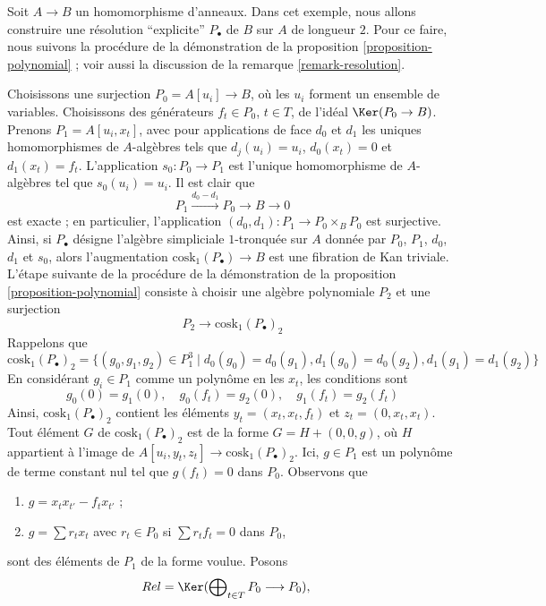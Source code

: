 \begin{example}
\label{example-resolution-length-two}
Soit $A \to B$ un homomorphisme d'anneaux. Dans cet exemple, nous allons 
construire une résolution ``explicite'' $P_\bullet$ de $B$ sur $A$ de longueur
$2$. Pour ce faire, nous suivons la procédure de la démonstration de la
proposition \ref{proposition-polynomial} ; voir aussi la discussion de la
remarque \ref{remark-resolution}.

\medskip\noindent
Choisissons une surjection $P_0 = A[u_i] \to B$, où les $u_i$ forment un
ensemble de variables. Choisissons des générateurs $f_t \in P_0$, $t \in T$,
de l'idéal $\Ker(P_0 \to B)$. Prenons $P_1 = A[u_i, x_t]$, avec pour
applications de face $d_0$ et $d_1$ les uniques homomorphismes de $A$-algèbres
tels que $d_j(u_i) = u_i$, $d_0(x_t) = 0$ et $d_1(x_t) = f_t$.
L'application $s_0 : P_0 \to P_1$ est l'unique homomorphisme de $A$-algèbres
tel que $s_0(u_i) = u_i$. Il est clair que
$$
P_1 \xrightarrow{d_0 - d_1} P_0 \to B \to 0
$$
est exacte ; en particulier, l'application
$(d_0, d_1) : P_1 \to P_0 \times_B P_0$ est surjective. Ainsi, si
$P_\bullet$ désigne l'algèbre simpliciale $1$-tronquée sur $A$ donnée par $P_0$,
$P_1$, $d_0$, $d_1$ et $s_0$, alors l'augmentation
$\text{cosk}_1(P_\bullet) \to B$ est une fibration de Kan triviale. L'étape
suivante de la procédure de la démonstration de la proposition
\ref{proposition-polynomial} consiste à choisir une algèbre polynomiale $P_2$
et une surjection
$$
P_2 \longrightarrow \text{cosk}_1(P_\bullet)_2
$$
Rappelons que
$$
\text{cosk}_1(P_\bullet)_2 =
\{(g_0, g_1, g_2) \in P_1^3 \mid d_0(g_0) = d_0(g_1),
d_1(g_0) = d_0(g_2), d_1(g_1) = d_1(g_2)\}
$$
En considérant $g_i \in P_1$ comme un polynôme en les $x_t$, les conditions
sont
$$
g_0(0) = g_1(0),\quad
g_0(f_t) = g_2(0),\quad
g_1(f_t) = g_2(f_t)
$$
Ainsi, $\text{cosk}_1(P_\bullet)_2$ contient les éléments
$y_t = (x_t, x_t, f_t)$ et $z_t = (0, x_t, x_t)$. Tout élément $G$ de
$\text{cosk}_1(P_\bullet)_2$ est de la forme $G = H + (0, 0, g)$, où $H$
appartient à l'image de
$A[u_i, y_t, z_t] \to \text{cosk}_1(P_\bullet)_2$. Ici, $g \in P_1$ est un
polynôme de terme constant nul tel que $g(f_t) = 0$ dans $P_0$. Observons que
\begin{enumerate}
\item $g = x_t x_{t'} - f_t x_{t'}$ ;
\item $g = \sum r_t x_t$ avec $r_t \in P_0$ si $\sum r_t f_t = 0$ dans $P_0$,
\end{enumerate}
sont des éléments de $P_1$ de la forme voulue. Posons
$$
Rel = \Ker(\bigoplus\nolimits_{t \in T} P_0 \longrightarrow P_0),\quad
$$
\end{example}
